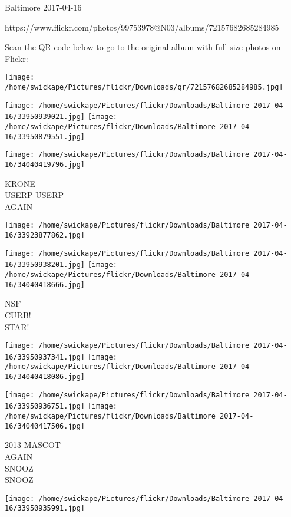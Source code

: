 \documentclass[10pt,letterpaper]{article}
\begin{document}
Baltimore 2017-04-16

https://www.flickr.com/photos/99753978@N03/albums/72157682685284985

Scan the QR code below to go to the original album with full-size photos on Flickr:

\texttt{[image: /home/swickape/Pictures/flickr/Downloads/qr/72157682685284985.jpg]}
\pagebreak

\texttt{[image: /home/swickape/Pictures/flickr/Downloads/Baltimore 2017-04-16/33950939021.jpg]}
\texttt{[image: /home/swickape/Pictures/flickr/Downloads/Baltimore 2017-04-16/33950879551.jpg]}

\texttt{[image: /home/swickape/Pictures/flickr/Downloads/Baltimore 2017-04-16/34040419796.jpg]}

KRONE\\
USERP USERP\\
AGAIN\\
\pagebreak

\texttt{[image: /home/swickape/Pictures/flickr/Downloads/Baltimore 2017-04-16/33923877862.jpg]}

\vspace{0.25in}
\texttt{[image: /home/swickape/Pictures/flickr/Downloads/Baltimore 2017-04-16/33950938201.jpg]}
\texttt{[image: /home/swickape/Pictures/flickr/Downloads/Baltimore 2017-04-16/34040418666.jpg]}

NSF\\
CURB!\\
STAR!\\
\pagebreak

\texttt{[image: /home/swickape/Pictures/flickr/Downloads/Baltimore 2017-04-16/33950937341.jpg]}
\texttt{[image: /home/swickape/Pictures/flickr/Downloads/Baltimore 2017-04-16/34040418086.jpg]}

\texttt{[image: /home/swickape/Pictures/flickr/Downloads/Baltimore 2017-04-16/33950936751.jpg]}
\texttt{[image: /home/swickape/Pictures/flickr/Downloads/Baltimore 2017-04-16/34040417506.jpg]}

2013 MASCOT\\
AGAIN\\
SNOOZ\\
SNOOZ\\
\pagebreak

\texttt{[image: /home/swickape/Pictures/flickr/Downloads/Baltimore 2017-04-16/33950935991.jpg]}
\end{document}
